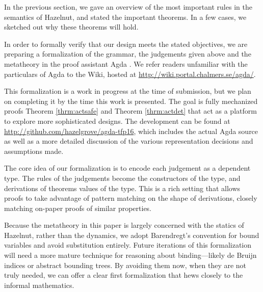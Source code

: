In the previous section, we gave an overview of the most important rules in
the semantics of Hazelnut, and stated the important theorems. In a few
cases, we sketched out why these theorems will hold.

In order to formally verify that our design meets the stated objectives, we
are preparing a formalization of the grammar, the judgements given above
and the metatheory in the proof assistant Agda \cite{norell:thesis}. We
refer readers unfamiliar with the particulars of Agda to the Wiki, hosted
at \url{http://wiki.portal.chalmers.se/agda/}.

This formalization is a work in progress at the time of submission, but we
plan on completing it by the time this work is presented. The goal is fully
mechanized proofs Theorem \ref{thrm:actsafe} and Theorem \ref{thrm:actdet}
that act as a platform to explore more sophisticated designs. The
development can be found at
\url{http://github.com/hazelgrove/agda-tfp16}, which includes the actual Agda
source as well as a more detailed discussion of the various representation
decisions and assumptions made.

The core idea of our formalization is to encode each judgement as a
dependent type. The rules of the judgements become the constructors of the
type, and derivations of theorems values of the type. This is a rich
setting that allows proofs to take advantage of pattern matching on the
shape of derivations, closely matching on-paper proofs of similar
properties.

Because the metatheory in this paper is largely concerned with the statics
of Hazelnut, rather than the dynamics, we adopt Barendregt's convention for
bound variables and avoid substitution entirely.\cite{urban} Future iterations
of this formalization will need a more mature technique for reasoning about
binding---likely de Bruijn indices or abstract bounding trees. By avoiding
them now, when they are not truly needed, we can offer a clear first
formalization that hews closely to the informal mathematics.
